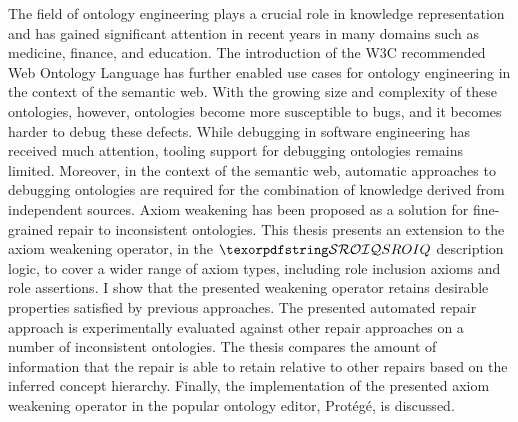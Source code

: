The field of ontology engineering plays a crucial role in knowledge representation and has gained significant attention in recent years in many domains such as medicine, finance, and education. The introduction of the W3C recommended Web Ontology Language has further enabled use cases for ontology engineering in the context of the semantic web. With the growing size and complexity of these ontologies, however, ontologies become more susceptible to bugs, and it becomes harder to debug these defects. While debugging in software engineering has received much attention, tooling support for debugging ontologies remains limited. Moreover, in the context of the semantic web, automatic approaches to debugging ontologies are required for the combination of knowledge derived from independent sources. Axiom weakening has been proposed as a solution for fine-grained repair to inconsistent ontologies. This thesis presents an extension to the axiom weakening operator, in the $\SROIQ$ description logic, to cover a wider range of axiom types, including role inclusion axioms and role assertions. I show that the presented weakening operator retains desirable properties satisfied by previous approaches. The presented automated repair approach is experimentally evaluated against other repair approaches on a number of inconsistent ontologies. The thesis compares the amount of information that the repair is able to retain relative to other repairs based on the inferred concept hierarchy. Finally, the implementation of the presented axiom weakening operator in the popular ontology editor, Protégé, is discussed.
